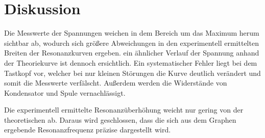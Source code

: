 \section{Diskussion}
\label{sec:Diskussion}

Die Messwerte der Spannungen weichen in dem Bereich um das Maximum herum sichtbar ab, wodurch sich größere Abweichungen
in den experimentell ermittelten Breiten der Resonanzkurven ergeben. ein ähnlicher Verlauf der Spannung anhand
der Theoriekurve ist dennoch ersichtlich.
Ein systematischer Fehler liegt bei dem Tastkopf vor,
welcher bei nur kleinen Störungen die Kurve deutlich verändert und somit die Messwerte verfälscht. Außerdem
werden die Widerstände von Kondensator und Spule vernachlässigt.


Die experimentell ermittelte Resonanzüberhöhung weicht nur gering von der theoretischen ab. Daraus wird
geschlossen, dass die sich aus dem Graphen ergebende Resonanzfrequenz präzise dargestellt wird.
